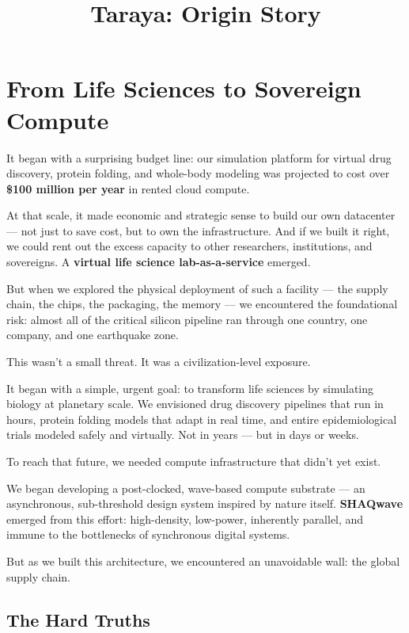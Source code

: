 \documentclass[11pt]{article}
\title{\textbf{Taraya: Origin Story}}
\date{}
\begin{document}
\maketitle

\section*{From Life Sciences to Sovereign Compute}

It began with a surprising budget line: our simulation platform for virtual drug discovery, protein folding, and whole-body modeling was projected to cost over \textbf{\$100 million per year} in rented cloud compute.

At that scale, it made economic and strategic sense to build our own datacenter — not just to save cost, but to own the infrastructure. And if we built it right, we could rent out the excess capacity to other researchers, institutions, and sovereigns. A \textbf{virtual life science lab-as-a-service} emerged.

But when we explored the physical deployment of such a facility — the supply chain, the chips, the packaging, the memory — we encountered the foundational risk: almost all of the critical silicon pipeline ran through one country, one company, and one earthquake zone.

This wasn’t a small threat. It was a civilization-level exposure.



It began with a simple, urgent goal: to transform life sciences by simulating biology at planetary scale. We envisioned drug discovery pipelines that run in hours, protein folding models that adapt in real time, and entire epidemiological trials modeled safely and virtually. Not in years — but in days or weeks.

To reach that future, we needed compute infrastructure that didn’t yet exist.

We began developing a post-clocked, wave-based compute substrate — an asynchronous, sub-threshold design system inspired by nature itself. \textbf{SHAQwave} emerged from this effort: high-density, low-power, inherently parallel, and immune to the bottlenecks of synchronous digital systems.

But as we built this architecture, we encountered an unavoidable wall: the global supply chain.

\subsection*{The Hard Truths}
\end{document}
